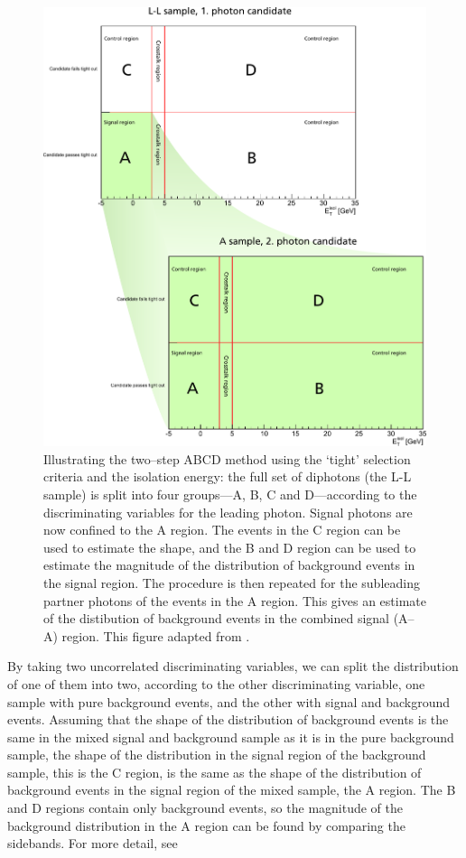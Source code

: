 \begin{figure}[hbp]
  \includegraphics[width=\textwidth]{figures/sideband}
  \caption{Illustrating the two--step ABCD method using the `tight' selection criteria and the isolation energy: the full set of diphotons (the L-L sample) is split into four groups---A, B, C and D---according to the discriminating variables for the leading photon. Signal photons are now confined to the A region. The events in the C region can be used to estimate the shape, and the B and D region can be used to estimate the magnitude of the distribution of background events in the signal region. The procedure is then repeated for the subleading partner photons of the events in the A region. This gives an estimate of the distibution of background events in the combined signal (A--A) region. This figure adapted from \cite{fdirect}.}\label{abcd}
\end{figure}

By taking two uncorrelated discriminating variables, we can split the distribution of one of them into two, according to the other discriminating variable, one sample with pure background events, and the other with signal and background events. Assuming that the shape of the distribution of background events is the same in the mixed signal and background sample as it is in the pure background sample, the shape of the distribution in the signal region of the background sample, this is the C region, is the same as the shape of the distribution of background events in the signal region of the mixed sample, the A region. The B and D regions contain only background events, so the magnitude of the background distribution in the A region can be found by comparing the sidebands. For more detail, see \cite{cmsabcd}

